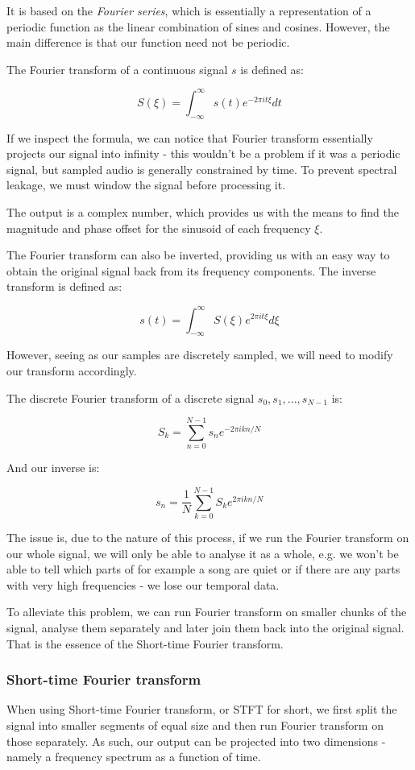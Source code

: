 It is based on the \emph{Fourier series}, which is essentially a representation of a periodic function as the linear combination of sines and cosines. \cite{Shatkay:1995:FTP:864947} However, the main difference is that our function need not be periodic.

The Fourier transform of a continuous signal $s$ is defined as: \cite{Recoskie2014ConstrainedNM}

$$S(\xi) = \int_{-\infty}^{\infty}s(t)e^{-2\pi it\xi}dt$$

If we inspect the formula, we can notice that Fourier transform essentially projects our signal into infinity - this wouldn't be a problem if it was a periodic signal, but sampled audio is generally constrained by time. To prevent spectral leakage, we must window the signal before processing it.

The output is a complex number, which provides us with the means to find the magnitude and phase offset for the sinusoid of each frequency $\xi$.

The Fourier transform can also be inverted, providing us with an easy way to obtain the original signal back from its frequency components. The inverse transform is defined as:

$$s(t) = \int_{-\infty}^{\infty}S(\xi)e^{2\pi it\xi}d\xi$$

However, seeing as our samples are discretely sampled, we will need to modify our transform accordingly.

The discrete Fourier transform of a discrete signal $s_0, s_1, ..., s_{N-1}$ is: \cite{Recoskie2014ConstrainedNM}

$$S_k = \sum_{n=0}^{N-1}s_ne^{-2\pi ikn/N}$$

And our inverse is:

$$s_n = \frac1N \sum_{k=0}^{N-1}S_ke^{2\pi ikn/N}$$

The issue is, due to the nature of this process, if we run the Fourier transform on our whole signal, we will only be able to analyse it as a whole, e.g. we won't be able to tell which parts of for example a song are quiet or if there are any parts with very high frequencies - we lose our temporal data.

To alleviate this problem, we can run Fourier transform on smaller chunks of the signal, analyse them separately and later join them back into the original signal. That is the essence of the Short-time Fourier transform.

\subsubsection{Short-time Fourier transform}
When using Short-time Fourier transform, or STFT for short, we first split the signal into smaller segments of equal size and then run Fourier transform on those separately. As such, our output can be projected into two dimensions - namely a frequency spectrum as a function of time.

